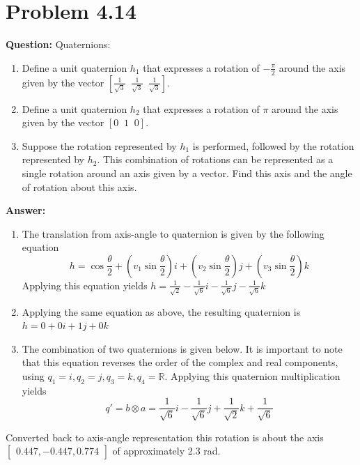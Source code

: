 \documentclass[10pt,letterpaper]{article}
\begin{document}
\section{Problem 4.14}
\textbf{Question: }Quaternions:
\begin{enumerate}
\item Define a unit quaternion $ h_1$ that expresses a rotation of  $ -\frac{\pi}{2}$ around the axis given by the vector  $ [ \frac{1}{\sqrt
3} \;\; \frac{1}{\sqrt 3} \;\; \frac{1}{\sqrt 3} ]$.
\item Define a unit quaternion $ h_2$ that expresses a rotation of $ \pi $ around the axis given by the vector  $ [ 0 \;\; 1 \;\; 0 ]$.
\item Suppose the rotation represented by $ h_1$ is performed, followed by the rotation represented by $ h_2$. This combination of rotations can be represented as a single rotation around an axis given by a vector. Find this axis and the angle of rotation about this axis. 
\end{enumerate}

\textbf{Answer: } \begin{enumerate}
\item The translation from axis-angle to quaternion is given by the following equation 
\begin{equation*}
h = \cos \frac{\theta}{2} + \left( v_1 \sin \frac{\theta}{2} \right)i + \left(v_2 \sin\frac{\theta}{2} \right) j + \left( v_3 \sin \frac{\theta}{2} \right) k
\end{equation*} 
Applying this equation yields $h = \frac{1}{\sqrt{2}} -\frac{1}{\sqrt{6}}i -\frac{1}{\sqrt{6}}j -\frac{1}{\sqrt{6}}k $
\item Applying the same equation as above, the resulting quaternion is $h = 0 + 0i + 1j + 0k$
\item The combination of two quaternions is given below. It is important to note that this equation reverses the order of the complex and real components, using $q_1 = i, q_2 = j, q_3 = k, q_4 = \mathbb{R}$. Applying this quaternion multiplication yields 
\begin{equation}
q' = b\otimes a = \frac{1}{\sqrt{6}}i -\frac{1}{\sqrt{6}}j + \frac{1}{\sqrt{2}}k + \frac{1}{\sqrt{6}}
\end{equation}
\end{enumerate}

Converted back to axis-angle representation this rotation is about the axis $\begin{bmatrix}0.447, -0.447, 0.774\end{bmatrix}$ of approximately 2.3 rad.
\end{document}
